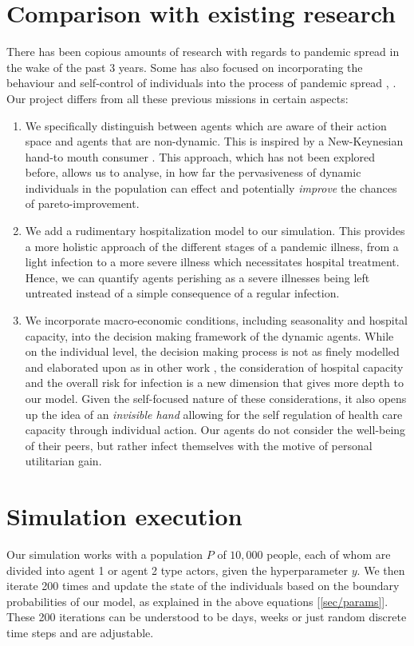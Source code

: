 \documentclass[]{article}
\begin{document}
\section{Comparison with existing research}
There has been copious amounts of research with regards to pandemic spread in the wake of the past 3 years. Some has also focused on incorporating the behaviour and self-control of individuals into the process of pandemic spread \cite{gosak2021endogenous}, \cite{kleczkowski2015spontaneous}. Our project differs from all these previous missions in certain aspects: 
\begin{enumerate}
    \item We specifically distinguish between agents which are aware of their action space and agents that are non-dynamic. This is inspired by a New-Keynesian hand-to mouth consumer \cite{gabaix2020behavioral}. This approach, which has not been explored before, allows us to analyse, in how far the pervasiveness of dynamic individuals in the population can effect and potentially \textit{improve} the chances of pareto-improvement.

    \item We add a rudimentary hospitalization model to our simulation. This provides a more holistic approach of the different stages of a pandemic illness, from a light infection to a more severe illness which necessitates hospital treatment. Hence, we can quantify agents perishing as a severe illnesses being left untreated instead of a simple consequence of a regular infection. 

    \item We incorporate macro-economic conditions, including seasonality and hospital capacity, into the decision making framework of the dynamic agents. While on the individual level, the decision making process is not as finely modelled and elaborated upon as in other work \cite{gosak2021endogenous}, the consideration of hospital capacity and the overall risk for infection is a new dimension that gives more depth to our model. Given the self-focused nature of these considerations, it also opens up the idea of an \textit{invisible hand} allowing for the self regulation of health care capacity through individual action. Our agents do not consider the well-being of their peers, but rather infect themselves with the motive of personal utilitarian gain. 

    

\end{enumerate}
\section{Simulation execution}
Our simulation works with a population $P$ of $10,000$ people, each of whom are divided into agent 1 or agent 2 type actors, given the hyperparameter $y$. We then iterate 200 times and update the state of the individuals based on the boundary probabilities of our model, as explained in the above equations [\ref{sec/params}]. These 200 iterations can be understood to be days, weeks or just random discrete time steps and are adjustable.
\end{document}
